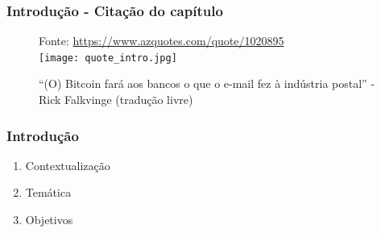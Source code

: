 \documentclass[aspectratio=43,8pt]{beamer}%
\begin{document}
\begin{frame}
	\frametitle{Introdução - Citação do capítulo}
	
		\begin{figure}
		\centering
		{\footnotesize Fonte:  \url{https://www.azquotes.com/quote/1020895}}\\
		\texttt{[image: quote\_intro.jpg]}
		\caption{``(O) Bitcoin fará aos bancos o que o e-mail
			fez à indústria postal'' - Rick Falkvinge
			(tradução livre)}
		\end{figure}
\end{frame}

\begin{frame}
	\frametitle{Introdução}
	
	\begin{keypoint}
	
	\begin{enumerate}
		\item Contextualização
 \pause
		
		\item Temática 
\pause
		
		\item Objetivos 
	\end{enumerate}
	\end{keypoint}
		\end{frame}
	
\end{document}
